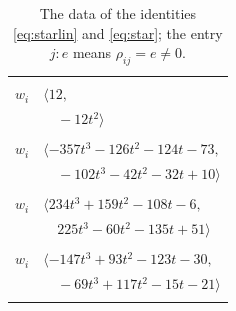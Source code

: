 \documentclass[11pt]{article}
\begin{document}
\begingroup\scriptsize
\setlength{\LTcapwidth}{\textwidth}
\begin{longtable}{@{}ll@{}}
\caption{The data of the identities \eqref{eq:starlin} and \eqref{eq:star}; the entry $j{:}e$ means $\rho_{ij}=e\neq0$.}\label{tab:star}\\
\hline\endfirsthead\hline\endhead\hline\endfoot
\multicolumn{2}{@{}p{0.97\textwidth}@{}}{$i=0$, $D_i=1$, $\rho_{ij}$: $9{:}1, \allowbreak 26{:}1, \allowbreak 35{:}2, \allowbreak 43{:}2, \allowbreak 50{:}2, \allowbreak 58{:}2, \allowbreak 62{:}2$}\\
$w_i$ & $\langle 12,$\\
 & $\quad -12t^{2}\rangle$\\
\addlinespace[2pt]
\multicolumn{2}{@{}p{0.97\textwidth}@{}}{$i=1$, $D_i=9$, $\rho_{ij}$: $8{:}2, \allowbreak 9{:}2, \allowbreak 14{:}2, \allowbreak 15{:}2, \allowbreak 16{:}1, \allowbreak 26{:}1, \allowbreak 31{:}2, \allowbreak 35{:}2, \allowbreak 37{:}2, \allowbreak 38{:}1, \allowbreak 40{:}2, \allowbreak 41{:}1, \allowbreak 44{:}2, \allowbreak 45{:}1, \allowbreak 61{:}2, \allowbreak 70{:}1$}\\
$w_i$ & $\langle -357t^{3}-126t^{2}-124t-73,$\\
 & $\quad -102t^{3}-42t^{2}-32t+10\rangle$\\
\addlinespace[2pt]
\multicolumn{2}{@{}p{0.97\textwidth}@{}}{$i=2$, $D_i=3$, $\rho_{ij}$: $13{:}1, \allowbreak 14{:}2, \allowbreak 15{:}1, \allowbreak 16{:}1, \allowbreak 31{:}2, \allowbreak 33{:}1, \allowbreak 37{:}2, \allowbreak 41{:}1, \allowbreak 42{:}1, \allowbreak 45{:}1, \allowbreak 46{:}1, \allowbreak 59{:}2, \allowbreak 60{:}1, \allowbreak 62{:}2, \allowbreak 68{:}1$}\\
$w_i$ & $\langle 234t^{3}+159t^{2}-108t-6,$\\
 & $\quad 225t^{3}-60t^{2}-135t+51\rangle$\\
\addlinespace[2pt]
\multicolumn{2}{@{}p{0.97\textwidth}@{}}{$i=3$, $D_i=9$, $\rho_{ij}$: $19{:}1, \allowbreak 20{:}2, \allowbreak 25{:}1, \allowbreak 31{:}1, \allowbreak 32{:}1, \allowbreak 33{:}2, \allowbreak 34{:}1, \allowbreak 41{:}2, \allowbreak 44{:}1, \allowbreak 46{:}2, \allowbreak 52{:}1, \allowbreak 53{:}1, \allowbreak 54{:}2, \allowbreak 58{:}1, \allowbreak 59{:}2, \allowbreak 66{:}1, \allowbreak 71{:}2$}\\
$w_i$ & $\langle -147t^{3}+93t^{2}-123t-30,$\\
 & $\quad -69t^{3}+117t^{2}-15t-21\rangle$\\
\addlinespace[2pt]
\multicolumn{2}{@{}p{0.97\textwidth}@{}}{$i=4$, $D_i=48$, $\rho_{ij}$: $10{:}1, \allowbreak 12{:}2, \allowbreak 13{:}2, \allowbreak 26{:}1, \allowbreak 34{:}2, \allowbreak 36{:}1, \allowbreak 38{:}1, \allowbreak 42{:}2, \allowbreak 46{:}1, \allowbreak 54{:}2$}\\

\end{longtable}
\end{document}
